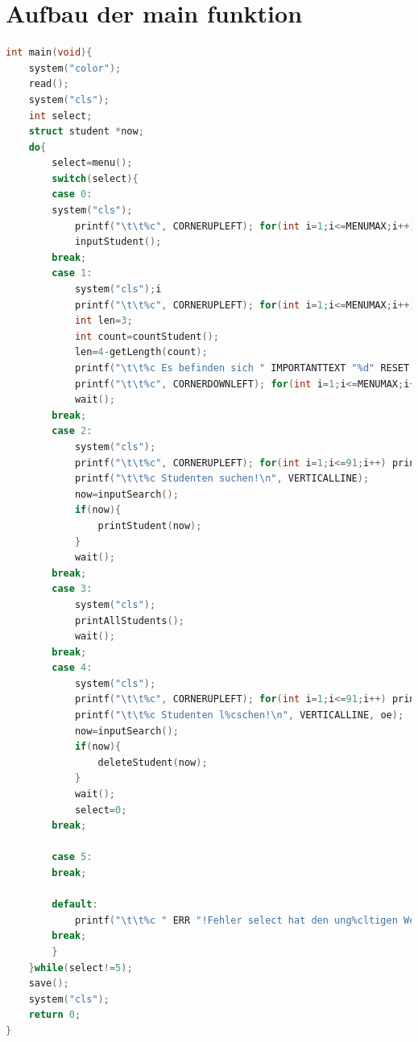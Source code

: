 \documentclass[a4paper, 11pt, oneside]{book} %
\begin{document}
\section{Aufbau der main funktion}
\begin{lstlisting}[language=C]
	int main(void){
    system("color"); 
    read();
    system("cls");
    int select;
    struct student *now;
    do{
        select=menu();
        switch(select){
        case 0:
        system("cls");
            printf("\t\t%c", CORNERUPLEFT); for(int i=1;i<=MENUMAX;i++) printf("%c", HORIZONLINE); printf("%c\n", CORNERUPRIGHT);
            inputStudent();
        break;
        case 1:
            system("cls");i
            printf("\t\t%c", CORNERUPLEFT); for(int i=1;i<=MENUMAX;i++) printf("%c", HORIZONLINE); printf("%c\n", CORNERUPRIGHT);
            int len=3;
            int count=countStudent();
            len=4-getLength(count);
            printf("\t\t%c Es befinden sich " IMPORTANTTEXT "%d" RESET, VERTICALLINE, count);  printf(" Eintr%cge in der Datenbank!     ", ae); for(int i=0;i<len;i++) printf(" "); printf("%c\n", VERTICALLINE);
            printf("\t\t%c", CORNERDOWNLEFT); for(int i=1;i<=MENUMAX;i++) printf("%c", HORIZONLINE); printf("%c\n", CORNERDOWNRIGHT);
            wait();
        break;
        case 2:
            system("cls");
            printf("\t\t%c", CORNERUPLEFT); for(int i=1;i<=91;i++) printf("%c", HORIZONLINE); printf("%c\n", CORNERUPRIGHT);
            printf("\t\t%c Studenten suchen!\n", VERTICALLINE); 
            now=inputSearch();
            if(now){
                printStudent(now);
            }
            wait();
        break;
        case 3:
            system("cls");
            printAllStudents();
            wait();
        break;
        case 4:
            system("cls");
            printf("\t\t%c", CORNERUPLEFT); for(int i=1;i<=91;i++) printf("%c", HORIZONLINE); printf("%c\n", CORNERUPRIGHT);
            printf("\t\t%c Studenten l%cschen!\n", VERTICALLINE, oe); 
            now=inputSearch();
            if(now){
                deleteStudent(now);
            }
            wait();
            select=0;
        break;
        
        case 5:
        break;
        
        default:
            printf("\t\t%c " ERR "!Fehler select hat den ung%cltigen Wert '%d'!\n" RESET, VERTICALLINE, ue, select);
        break;
        }
    }while(select!=5);
    save();
    system("cls");
    return 0;
}
\end{lstlisting}
\end{document}
